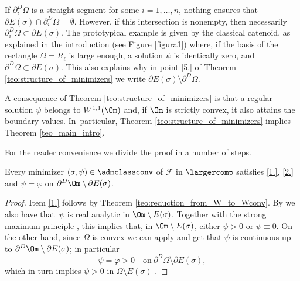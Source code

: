 \begin{remark}
If $\partial_i^D\Omega$ is a straight segment for some $i=1,\dots,n$,
nothing ensures that $\partial E(\sigma)\cap \partial_i^D\Omega=\emptyset$. However, if this intersection is nonempty, then necessarily
$\partial_i^D\Omega\subset\partial E(\sigma)$. The
prototypical example is given by the classical catenoid, as explained in the introduction (see Figure \ref{figura1}) where, if the basis of the rectangle $\Omega=R_{\ell}$ is large enough, a solution $\psi$ is identically zero, and $\partial^D\Omega\subset\partial E(\sigma)$.
This also explains why in point \ref{5.} of Theorem \ref{teo:structure_of_minimizers} we write $\partial E(\sigma)\setminus \partial^D\Omega$.
\end{remark}

A consequence of Theorem \ref{teo:structure_of_minimizers} is that a regular solution $\psi$ belongs to $W^{1,1}(\Om)$ and, if $\Om$ is strictly convex, it also attains the boundary values. In~particular, Theorem \ref{teo:structure_of_minimizers} implies Theorem \ref{teo_main_intro}.

For the reader convenience we divide the proof in a number of steps.
\begin{lemma}\label{lem:analicity}
Every minimizer $(\sigma,\psi)\in\admclassconv$ of $\mathcal F$ in
$\largercomp$ satisfies \ref{1.}, \ref{2.} and
$\psi=\varphi$ on $\partial^D\Om\setminus\partial E(\sigma)$.
\end{lemma}
\begin{proof} Item \ref{1.} follows by Theorem \ref{teo:reduction_from_W_to_Wconv}.
By \cite[Th.\,14.13]{Giusti:84}
we also have that~$\psi$ is real analytic in $\Om\setminus E(\sigma)$. Together with the strong maximum principle \cite[Th.\,C.4]{Giusti:84}, this implies that,
in $\Om\setminus E(\sigma)$,
either $\psi>0$ or $\psi\equiv0$.
On the other hand,
since $\Omega$ is convex we can apply \cite[Th.\,15.9]{Giusti:84} and get that $\psi$ is continuous up to $\partial^D\Om\setminus\partial E(\sigma)$; in particular
\begin{equation}\label{eq:boundary_value}
\psi=\varphi>0\quad\text{on}\ \partial^D\Omega\setminus\partial E(\sigma),
\end{equation}
which in turn implies $\psi>0$ in $\Omega\setminus E(\sigma)$ .
\end{proof}

